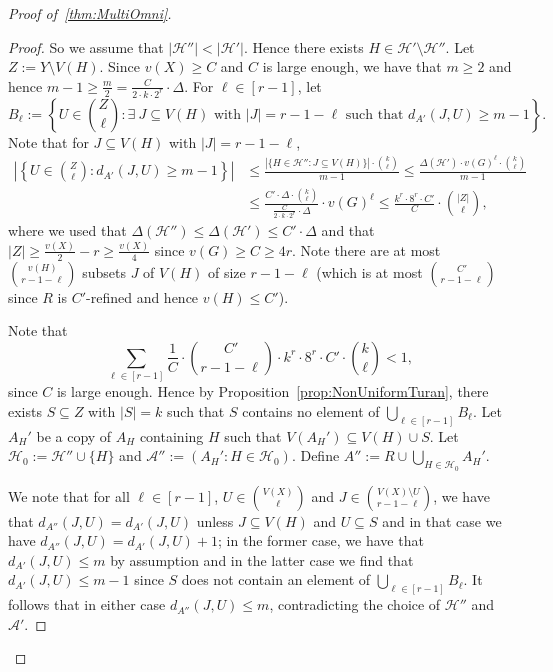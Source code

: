 \documentclass[11pt]{article}
\newcounter{i}
\theoremstyle{plain}
\renewcommand{\theclaim}{\thetheorem.\arabic{claim}}
\newenvironment{lateproof}[1]
 {%
  \renewcommand{\theclaim}{\ref{#1}.\arabic{claim}}%
  \begin{proof}[Proof of~\cref{#1}]%
 }
 {\end{proof}}
\theoremstyle{plain} %
\theoremstyle{definition}
\begin{document}
\begin{lateproof}{thm:MultiOmni}
\begin{proof}
So we assume that $|\mathcal{H}''| < |\mathcal{H}'|$. Hence there exists $H\in \mathcal{H}'\setminus \mathcal{H}''$. Let $Z:= Y\setminus V(H)$. Since $v(X)\ge C$ and $C$ is large enough, we have that $m\ge 2$ and hence $m-1\ge \frac{m}{2} = \frac{C}{2\cdot k \cdot 2^r} \cdot \Delta$.  For $\ell \in [r-1]$, let
$$B_{\ell} := \left\{ U\in \binom{Z}{\ell}: \exists~J \subseteq V(H) \text{ with } |J|=r-1-\ell \text{ such that } d_{A'}(J,U) \ge  m-1 \right\}.$$
Note that for $J\subseteq V(H)$ with $|J|=r-1-\ell$,
\begin{align*}
\left|\left\{ U\in \binom{Z}{\ell}: d_{A'}(J,U)\ge m-1\right\}\right| &\le \frac{|\{H \in \mathcal{H}'': J\subseteq V(H)\}| \cdot \binom{k}{\ell}}{m-1} \le \frac{\Delta(\mathcal{H}')\cdot v(G)^{\ell}\cdot \binom{k}{\ell}}{m-1} \\
&\le \frac{C'\cdot \Delta\cdot \binom{k}{\ell}}{\frac{C}{2\cdot k\cdot 2^r}\cdot \Delta} \cdot v(G)^{\ell} \le \frac{k^r\cdot 8^r\cdot C'}{C}\cdot \binom{|Z|}{\ell},
\end{align*}
where we used that $\Delta(\mathcal{H}'')\le \Delta(\mathcal{H}')\le C'\cdot \Delta$ and that $|Z|\ge \frac{v(X)}{2}-r\ge \frac{v(X)}{4}$ since $v(G)\ge C \ge 4r$. Note there are at most $\binom{v(H)}{r-1-\ell}$ subsets $J$ of $V(H)$ of size $r-1-\ell$ (which is at most $\binom{C'}{r-1-\ell}$ since $R$ is $C'$-refined and hence $v(H)\le C'$). 

Note that 
$$\sum_{\ell \in [r-1]} \frac{1}{C}\cdot \binom{C'}{r-1-\ell} \cdot k^r\cdot 8^r \cdot C'\cdot \binom{k}{\ell} < 1,$$ 
since $C$ is large enough. Hence by Proposition~\ref{prop:NonUniformTuran}, there exists $S\subseteq Z$ with $|S| = k$ such that $S$ contains no element of $\bigcup_{\ell \in [r-1]} B_{\ell}$. Let $A_H'$ be a copy of $A_H$ containing $H$ such that $V(A_H')\subseteq V(H)\cup S$. Let $\mathcal{H}_0:=\mathcal{H}''\cup \{H\}$ and $\mathcal{A}'':=(A_H': H\in \mathcal{H}_0)$. Define $A'':= R\cup \bigcup_{H\in\mathcal{H}_0} A_H'$.

We note that for all $\ell\in [r-1]$, $U\in \binom{V(X)}{\ell}$ and $J\in \binom{V(X)\setminus U}{r-1-\ell}$, we have that $d_{A''}(J,U)=d_{A'}(J,U)$ unless $J\subseteq V(H)$ and $U\subseteq S$ and in that case we have $d_{A''}(J,U)= d_{A'}(J,U)+1$; in the former case, we have that $d_{A'}(J,U)\le m$ by assumption and in the latter case we find that $d_{A'}(J,U)\le m-1$ since $S$ does not contain an element of $\bigcup_{\ell \in [r-1]} B_{\ell}$. It follows that in either case $d_{A''}(J,U)\le m$, contradicting the choice of $\mathcal{H}''$ and $\mathcal{A}'$.
\end{proof}


\end{lateproof}
\end{document}
